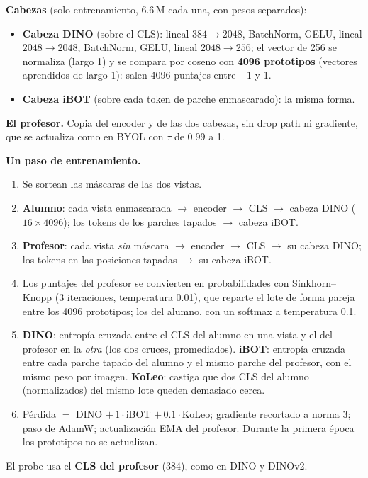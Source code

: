 \documentclass[11pt,a4paper]{article}
\begin{document}
\textbf{Cabezas} (solo entrenamiento, 6.6\,M cada una, con pesos separados):
\begin{itemize}
\item \textbf{Cabeza DINO} (sobre el CLS): lineal $384\rightarrow2048$, BatchNorm, GELU, lineal
  $2048\rightarrow2048$, BatchNorm, GELU, lineal $2048\rightarrow256$; el vector de 256 se normaliza
  (largo 1) y se compara por coseno con \textbf{4096 prototipos} (vectores aprendidos de largo 1):
  salen 4096 puntajes entre $-1$ y 1.
\item \textbf{Cabeza iBOT} (sobre cada token de parche enmascarado): la misma forma.
\end{itemize}

\textbf{El profesor.} Copia del encoder y de las dos cabezas, sin drop path ni gradiente, que se
actualiza como en BYOL con $\tau$ de 0.99 a 1.

\textbf{Un paso de entrenamiento.}
\begin{enumerate}
\item Se sortean las máscaras de las dos vistas.
\item \textbf{Alumno}: cada vista enmascarada $\rightarrow$ encoder $\rightarrow$ CLS $\rightarrow$
  cabeza DINO ($16\times4096$); los tokens de los parches tapados $\rightarrow$ cabeza iBOT.
\item \textbf{Profesor}: cada vista \emph{sin} máscara $\rightarrow$ encoder $\rightarrow$ CLS
  $\rightarrow$ su cabeza DINO; los tokens en las posiciones tapadas $\rightarrow$ su cabeza iBOT.
\item Los puntajes del profesor se convierten en probabilidades con Sinkhorn--Knopp (3 iteraciones,
  temperatura 0.01), que reparte el lote de forma pareja entre los 4096 prototipos; los del alumno,
  con un softmax a temperatura 0.1.
\item \textbf{DINO}: entropía cruzada entre el CLS del alumno en una vista y el del profesor en la
  \emph{otra} (los dos cruces, promediados). \textbf{iBOT}: entropía cruzada entre cada parche tapado
  del alumno y el mismo parche del profesor, con el mismo peso por imagen. \textbf{KoLeo}: castiga
  que dos CLS del alumno (normalizados) del mismo lote queden demasiado cerca.
\item Pérdida $=$ DINO $+\,1\cdot$iBOT $+\,0.1\cdot$KoLeo; gradiente recortado a norma 3; paso de
  AdamW; actualización EMA del profesor. Durante la primera época los prototipos no se actualizan.
\end{enumerate}
El probe usa el \textbf{CLS del profesor} (384), como en DINO y DINOv2.
\end{document}
